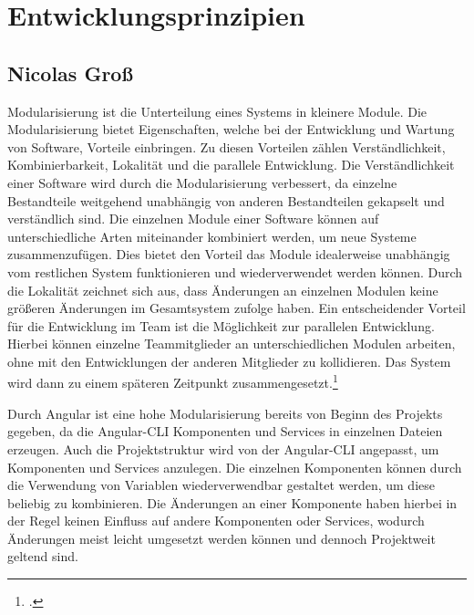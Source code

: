 
\section{Entwicklungsprinzipien}

\subsection*{Nicolas Groß}

Modularisierung ist die Unterteilung eines Systems in kleinere Module. Die Modularisierung bietet Eigenschaften, welche bei der Entwicklung und Wartung von Software, Vorteile einbringen.  Zu diesen Vorteilen zählen Verständlichkeit, Kombinierbarkeit, Lokalität und die parallele Entwicklung. Die Verständlichkeit einer Software wird durch die Modularisierung verbessert, da einzelne Bestandteile weitgehend unabhängig von anderen Bestandteilen gekapselt und verständlich sind. Die einzelnen Module einer Software können auf unterschiedliche Arten miteinander kombiniert werden, um neue Systeme zusammenzufügen. Dies bietet den Vorteil das Module idealerweise unabhängig vom restlichen System funktionieren und wiederverwendet werden können. Durch die Lokalität zeichnet sich aus, dass Änderungen an einzelnen Modulen keine größeren Änderungen im Gesamtsystem zufolge haben. Ein entscheidender Vorteil für die Entwicklung im Team ist die Möglichkeit zur parallelen Entwicklung. Hierbei können einzelne Teammitglieder an unterschiedlichen Modulen arbeiten, ohne mit den Entwicklungen der anderen Mitglieder zu kollidieren. Das System wird dann zu einem späteren Zeitpunkt zusammengesetzt.\footcite[.vgl]{Schmidauer2002}

Durch Angular ist eine hohe Modularisierung bereits von Beginn des Projekts gegeben, da die Angular-CLI Komponenten und Services in einzelnen Dateien erzeugen. Auch die Projektstruktur wird von der Angular-CLI angepasst, um Komponenten und Services anzulegen. Die einzelnen Komponenten können durch die Verwendung von Variablen wiederverwendbar gestaltet werden, um diese beliebig zu kombinieren. Die Änderungen an einer Komponente haben hierbei in der Regel keinen Einfluss auf andere Komponenten oder Services, wodurch Änderungen meist leicht umgesetzt werden können und dennoch Projektweit geltend sind.
